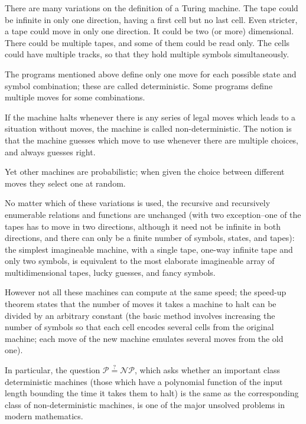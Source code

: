 \documentclass[12pt]{article}
\begin{document}
There are many variations on the definition of a Turing machine.  The tape could be infinite in only one direction, having a first cell but no last cell.  Even stricter, a tape could move in only one direction.  It could be two (or more) dimensional.  There could be multiple tapes, and some of them could be read only.  The cells could have multiple tracks, so that they hold multiple symbols simultaneously.

The programs mentioned above define only one move for each possible state and symbol combination; these are called deterministic.  Some programs define multiple moves for some combinations.

If the machine halts whenever there is any series of legal moves which leads to a situation without moves, the machine is called non-deterministic.  The notion is that the machine guesses which move to use whenever there are multiple choices, and always guesses right.

Yet other machines are probabilistic; when given the choice between different moves they select one at random.

No matter which of these variations is used, the recursive and recursively enumerable relations and functions are unchanged (with two exception--one of the tapes has to move in two directions, although it need not be infinite in both directions, and there can only be a finite number of symbols, states, and tapes): the simplest imagineable machine, with a single tape, one-way infinite tape and only two symbols, is equivalent to the most elaborate imagineable array of multidimensional tapes, lucky guesses, and fancy symbols.

However not all these machines can compute at the same speed; the speed-up theorem states that the number of moves it takes a machine to halt can be divided by an arbitrary constant (the basic method involves increasing the number of symbols so that each cell encodes several cells from the original machine; each move of the new machine emulates several moves from the old one).

In particular, the question $\mathcal{P}\overset{?}{=} \mathcal{NP}$, which asks whether an important class deterministic machines (those which have a polynomial function of the input length bounding the time it takes them to halt) is the same as the corresponding class of non-deterministic machines, is one of the major unsolved problems in modern mathematics.
\end{document}
